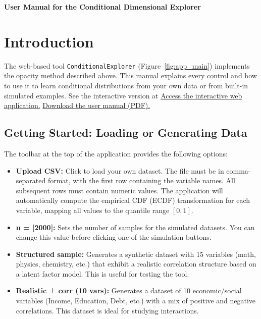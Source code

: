 \documentclass[12pt]{article}
\begin{document}
\tableofcontents
\newpage



\begin{center}
    {\bf User Manual for the Conditional Dimensional Explorer}

\end{center}

\section{Introduction}

The web-based tool \texttt{ConditionalExplorer} (Figure~\ref{fig:app_main}) implements the opacity method described above. This manual explains every control and how to use it to learn conditional distributions from your own data or from built-in simulated examples. See the interactive version at 
\href{http://enriquecastilloron-coder.github.io/PRUEBA/ConditionalExplorerFINAL.html}
{\textcolor{accentblue}{Access the interactive web application.}}
\href{https://raw.githubusercontent.com/enriquecastilloron-coder/PRUEBA/main/Manual_ConditionalDimensionalExplorer.pdf}
{\textcolor{accentblue}{Download the user manual (PDF).}}


\subsection{Getting Started: Loading or Generating Data}

The toolbar at the top of the application provides the following options:

\begin{itemize}
    \item \textbf{Upload CSV:} Click to load your own dataset. The file must be in comma-separated format, with the first row containing the variable names. All subsequent rows must contain numeric values. The application will automatically compute the empirical CDF (ECDF) transformation for each variable, mapping all values to the quantile range \([0,1]\).
    \item \textbf{n = [2000]:} Sets the number of samples for the simulated datasets. You can change this value before clicking one of the simulation buttons.
    \item \textbf{Structured sample:} Generates a synthetic dataset with 15 variables (math, physics, chemistry, etc.) that exhibit a realistic correlation structure based on a latent factor model. This is useful for testing the tool.
    \item \textbf{Realistic ± corr (10 vars):} Generates a dataset of 10 economic/social variables (Income, Education, Debt, etc.) with a mix of positive and negative correlations. This dataset is ideal for studying interactions.
\end{itemize}
\end{document}
